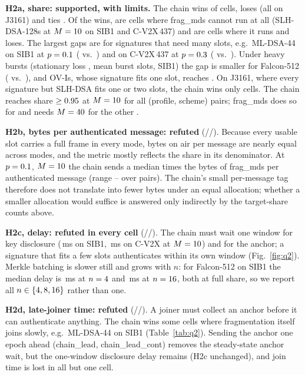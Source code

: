\documentclass[conference]{IEEEtran}
\newcommand{\mode}[1]{\textsf{#1}}
\begin{document}
\textbf{H2a, share: supported, with limits.} The chain wins \HaW{} of
\CellsShare{} cells, loses \HaL{} (all \HaLossScheme{} on J3161) and ties
\HaT. Of the wins, \HaInfeas{} are cells where \mode{frag\_mds} cannot run
at all (SLH-DSA-128s at $M=10$ on SIB1 and C-V2X\,437) and \HaRuns{}
are cells where it runs and loses. The largest gaps are for signatures
that need many slots, e.g.\ ML-DSA-44 on SIB1 at $p=0.1$
(\ShMLsibFragTen{} vs.\ \ShChainOne) and on C-V2X\,437 at $p=0.3$
(\ShMLcvFragThirty{} vs.\ \ShChainOne). Under heavy bursts (stationary
loss \GELossMax, mean burst \GEBurstMax{} slots, SIB1) the gap is smaller
for Falcon-512 (\ShFalsibFragGE{} vs.\ \ShChainsibGE), and OV-Is, whose
signature fits one slot, reaches \ShOVsibFragGE. On J3161, where every signature but
SLH-DSA fits one or two slots, the chain wins only \HaWj{} cells. The chain
reaches share $\ge0.95$ at $M=10$ for all \TgtPairs{}
(profile, scheme) pairs; \mode{frag\_mds} does so for \TgtFragMDS{} and
needs $M=40$ for the other \TgtFragMDSbig.

\textbf{H2b, bytes per authenticated message: refuted} (\HbW/\HbL/\HbT).
Because every usable slot carries a full frame in every mode, bytes on air
per message are nearly equal across modes, and the metric mostly reflects
the share in its denominator. At $p=0.1$, $M=10$ the chain sends a
median \ByteRatioMed{} times the bytes of \mode{frag\_mds} per
authenticated message (range \ByteRatioLo--\ByteRatioHi{} over
\BytePairs{} pairs). The chain's small per-message tag therefore does not
translate into fewer bytes under an equal allocation; whether a smaller
allocation would suffice is answered only indirectly by the target-share
counts above.

\textbf{H2c, delay: refuted in every cell} (\HcW/\HcL/\HcT). The chain must
wait one window for key disclosure (\WinSIB\,ms on SIB1, \WinCV\,ms on
C-V2X at $M=10$) and for the anchor; a signature that fits a few slots
authenticates within its own window (Fig.~\ref{fig:q2}).
Merkle batching is slower still and grows with $n$: for Falcon-512 on SIB1
the median delay is \MerkFourDelay\,ms at $n=4$ and
\MerkSixteenDelay\,ms at $n=16$, both at full share, so we report all $n\in\{4, 8, 16\}$ rather than
one.

\textbf{H2d, late-joiner time: refuted} (\HdW/\HdL/\HdT). A joiner must
collect an anchor before it can authenticate anything. The chain wins
some cells where fragmentation itself joins slowly, e.g.\ ML-DSA-44 on
SIB1 (Table~\ref{tab:q2}). Sending the anchor one epoch ahead
(\mode{chain\_lead}, \mode{chain\_lead\_cont}) removes the steady-state
anchor wait, but the one-window disclosure delay remains (H2c unchanged),
and join time is lost in all but one cell.
\end{document}
